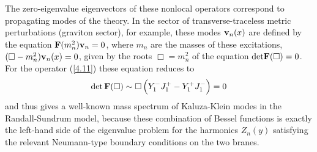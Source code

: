 \documentclass[a4paper,12pt]{article}
\begin{document}
The zero-eigenvalue eigenvectors of these nonlocal operators
correspond to propagating modes of the theory. In the sector of
transverse-traceless metric perturbations (graviton sector), for
example, these modes ${\bf v}_n(x)$ are defined by the equation
${\bf F}(m_n^2){\bf v}_n=0$, where $m_n$ are the masses of these
excitations, $(\Box-m_n^2){\bf v}_n(x)=0$, given by the
roots $\Box=m_n^2$ of the equation ${\rm det}{\bf F}(\Box)=0$. For
the operator (\ref{4.11}) these equation reduces to
    \begin{equation}
    {\rm det}\,{\bf F}(\Box)\sim
    \Box\,\Big(Y_1^-J_1^+-Y_1^+J_1^-\Big)=0  \label{4.33}
    \end{equation}
and thus gives a well-known mass spectrum of Kaluza-Klein modes in the
Randall-Sundrum model, because these combination of Bessel functions
is exactly the left-hand side of the eigenvalue problem for the
harmonics $Z_n(y)$ satisfying the relevant Neumann-type boundary
conditions on the two branes.
\end{document}
